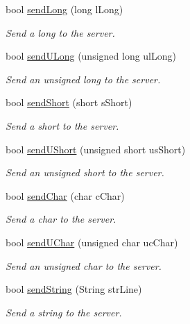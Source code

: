 \begin{DoxyCompactItemize}
bool \hyperlink{class_rad_jav_1_1_networking_1_1wx_widgets_t_c_p_client_a7158aca9f196ac2eedca9149f022be35}{send\+Long} (long l\+Long)
\begin{DoxyCompactList}\small\item\em Send a long to the server. \end{DoxyCompactList}\item 
bool \hyperlink{class_rad_jav_1_1_networking_1_1wx_widgets_t_c_p_client_a507236f083226e0e84229c9fc99dc10e}{send\+U\+Long} (unsigned long ul\+Long)
\begin{DoxyCompactList}\small\item\em Send an unsigned long to the server. \end{DoxyCompactList}\item 
bool \hyperlink{class_rad_jav_1_1_networking_1_1wx_widgets_t_c_p_client_a9e55f5e162e1f5b979a7a4eaabb1f9f1}{send\+Short} (short s\+Short)
\begin{DoxyCompactList}\small\item\em Send a short to the server. \end{DoxyCompactList}\item 
bool \hyperlink{class_rad_jav_1_1_networking_1_1wx_widgets_t_c_p_client_a5598335792abf5f93668fd55386e0487}{send\+U\+Short} (unsigned short us\+Short)
\begin{DoxyCompactList}\small\item\em Send an unsigned short to the server. \end{DoxyCompactList}\item 
bool \hyperlink{class_rad_jav_1_1_networking_1_1wx_widgets_t_c_p_client_a5c47f30760d3875d0ece7b0970f794b1}{send\+Char} (char c\+Char)
\begin{DoxyCompactList}\small\item\em Send a char to the server. \end{DoxyCompactList}\item 
bool \hyperlink{class_rad_jav_1_1_networking_1_1wx_widgets_t_c_p_client_a37f507d457f8c0e74ef6f480e8450f2c}{send\+U\+Char} (unsigned char uc\+Char)
\begin{DoxyCompactList}\small\item\em Send an unsigned char to the server. \end{DoxyCompactList}\item 
bool \hyperlink{class_rad_jav_1_1_networking_1_1wx_widgets_t_c_p_client_aecc6c8c21e722ac88540b39959616386}{send\+String} (String str\+Line)
\begin{DoxyCompactList}\small\item\em Send a string to the server. \end{DoxyCompactList}\item 

\end{DoxyCompactItemize}
